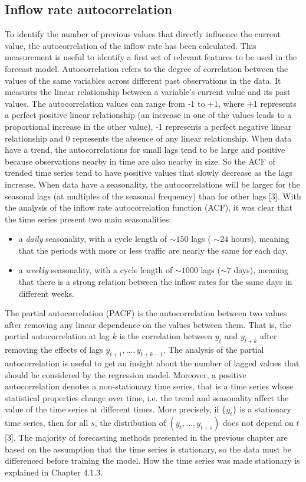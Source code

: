 \subsection{Inflow rate autocorrelation}
\label{subsec:autocorrelation}
To identify the number of previous values that directly influence the current value, the autocorrelation of the inflow rate has been calculated. This measurement is useful to identify a first set of relevant features to be used in the forecast model.
Autocorrelation refers to the degree of correlation between the values of the same variables across different past observations in the data. It measures the linear relationship between a variable's current value and its past values. The autocorrelation values can range from -1 to +1, where +1 represents a perfect positive linear relationship (an increase in one of the values leads to a proportional increase in the other value), -1 represents a perfect negative linear relationship and 0 represents the absence of any linear relationship. When data have a trend, the autocorrelations for small lags tend to be large and positive because observations nearby in time are also nearby in size. So the ACF of trended time series tend to have positive values that slowly decrease as the lags increase. When data have a seasonality, the autocorrelations will be larger for the seasonal lags (at multiples of the seasonal frequency) than for other lags [3]. With the analysis of the inflow rate autocorrelation function (ACF), it was clear that the time series present two main seasonalities:
\begin{itemize}
  \item a \emph{daily} seasonality, with a cycle length of \( \sim150 \) lags ( \( \sim24 \) hours), meaning that the periods with more or less traffic are nearly the same for each day.
  \item a \emph{weekly} seasonality, with a cycle length of \( \sim1000 \) lags (\( \sim7 \) days), meaning that there is a strong relation between the inflow rates for the same days in different weeks.
\end{itemize}

The partial autocorrelation (PACF) is the autocorrelation between two values after removing any linear dependence on the values between them. That is, the partial autocorrelation at lag $ k $ is the correlation between $ y_t $ and $ y_{t+k} $ after removing the effects of lags $ y_{t+1}, ..., y_{t+k-1} $. The analysis of the partial autocorrelation is useful to get an insight about the number of lagged values that should be considered by the regression model. Moreover, a positive autocorrelation denotes a non-stationary time series, that is a time series whose statistical properties change over time, i.e. the trend and seasonality affect the value of the time series at different times. More precisely, if $ \{ y_t \} $ is a stationary time series, then for all $ s $, the distribution of $ ( y_t, ..., y_{t+s}) $ does not depend on $ t $ [3]. The majority of forecasting methods presented in the previous chapter are based on the assumption that the time series is stationary, so the data must be differenced before training the model. How the time series was made stationary is explained in Chapter 4.1.3.

